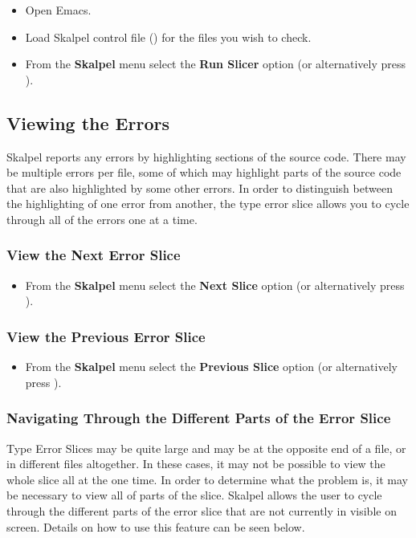 \documentclass{report}
\begin{document}
\begin{itemize}
\item Open Emacs.
\item Load Skalpel control file () for
  the files you wish to check.

\item From the \textbf{Skalpel} menu select the \textbf{Run Slicer}
  option (or alternatively press ).
\end{itemize}


\subsection{Viewing the Errors}

Skalpel reports any errors by highlighting sections of
the source code. There may be multiple errors per file, some of which
may highlight parts of the source code that are also highlighted by
some other errors. In order to distinguish between the highlighting
of one error from another, the type error slice allows you to cycle
through all of the errors one at a time.

\subsubsection{View the Next Error Slice}

\begin{itemize}
\item From the \textbf{Skalpel} menu select the \textbf{Next Slice}
  option (or alternatively press ).
\end{itemize}

\subsubsection{View the Previous Error Slice}

\begin{itemize}
\item From the \textbf{Skalpel} menu select the \textbf{Previous Slice}
  option (or alternatively press ).
\end{itemize}

\subsubsection{Navigating Through the Different Parts of the Error Slice}
Type Error Slices may be quite large and may be at the opposite end of
a file, or in different files altogether. In these cases, it may not
be possible to view the whole slice all at the one time. In order to
determine what the problem is, it may be necessary to view all of
parts of the slice. Skalpel allows the user to cycle
through the different parts of the error slice that are not currently
in visible on screen. Details on how to use this feature can be seen below.
\end{document}
